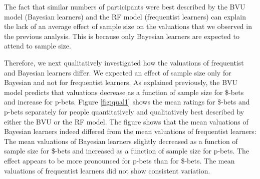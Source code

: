 \documentclass[a4paper,man, natbib]{apa6} %
\begin{document}
The fact that similar numbers of participants were best described by the BVU model (Bayesian learners) and the RF model (frequentist learners) can explain the lack of an average effect of  sample size on the valuations that we observed in the previous analysis. This is because only Bayesian learners are expected to attend to sample size. 

Therefore, we next qualitatively investigated how the valuations of frequentist and Bayesian learners differ. We expected an effect of sample size only for Bayesian and not for frequentist learners. As explained previously, the BVU model predicts that valuations decrease as a function of sample size for \$-bets and increase for p-bets. Figure \ref{fig:qual1} shows the mean ratings for \$-bets and p-bets separately for people quantitatively and qualitatively best described by either the BVU or the RF model. The figure shows that the mean valuations of Bayesian learners indeed differed from the mean valuations of frequentist learners: The mean valuations of Bayesian learners slightly decreased as a function of sample size for \$-bets and increased as a function of sample size for p-bets. The effect appears to be more pronounced for p-bets than for \$-bets. The mean valuations of frequentist learners did not show consistent variation.
\end{document}
